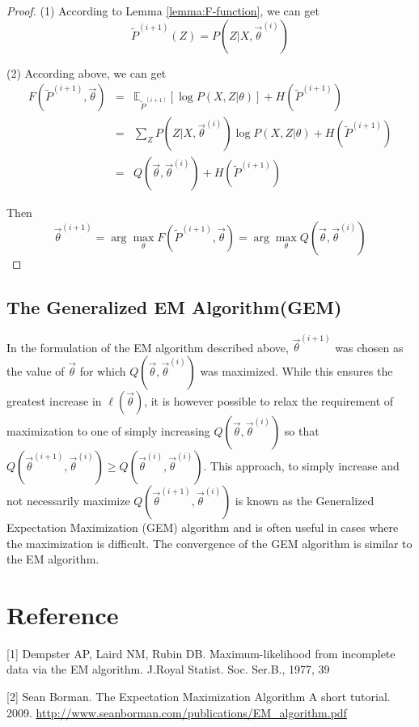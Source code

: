 \begin{proof}
(1) According to Lemma \ref{lemma:F-function}, we can get
\begin{equation}
\tilde{P}^{(i+1)}(Z)=P(Z|X, \vec{\theta}^{(i)}) \nonumber
\end{equation}

(2) According above, we can get
\begin{eqnarray}
F(\tilde{P}^{(i+1)},\vec{\theta}) &=& \mathbb{E}_{\tilde{P}^{(i+1)}}\left[\log{P(X,Z|\theta)}\right]+H(\tilde{P}^{(i+1)}) \nonumber \\
    &=& \sum\limits_Z{P(Z|X,\vec{\theta}^{(i)})\log{P(X,Z|\theta)}}+H(\tilde{P}^{(i+1)}) \nonumber \\
	&=& Q(\vec{\theta}, \vec{\theta}^{(i)})+H(\tilde{P}^{(i+1)})\nonumber
\end{eqnarray}

Then
\begin{equation}
\vec{\theta}^{(i+1)}=\arg\max\limits_{\theta}F(\tilde{P}^{(i+1)},\vec{\theta})=\arg\max\limits_{\theta}Q(\vec{\theta}, \vec{\theta}^{(i)}) \nonumber
\end{equation}
\end{proof}


\subsection{The Generalized EM Algorithm(GEM)}
In the formulation of the EM algorithm described above, $\vec{\theta}^{(i+1)}$ was chosen as the value of $\vec{\theta}$ for which $Q(\vec{\theta}, \vec{\theta}^{(i)})$ was maximized. While this ensures the greatest increase in $\ell(\vec{\theta})$, it is however possible to relax the requirement of maximization to one of simply increasing $Q(\vec{\theta}, \vec{\theta}^{(i)})$ so that $Q(\vec{\theta}^{(i+1)}, \vec{\theta}^{(i)}) \geq Q(\vec{\theta}^{(i)}, \vec{\theta}^{(i)})$. This approach, to simply increase and not necessarily maximize $Q(\vec{\theta}^{(i+1)}, \vec{\theta}^{(i)})$ is known as the Generalized Expectation Maximization (GEM) algorithm and is often useful in cases where the maximization is difficult. The convergence of the GEM algorithm is similar to the EM algorithm.


\section{Reference}
[1] Dempster AP, Laird NM, Rubin DB. Maximum-likelihood from incomplete data via the EM algorithm. J.Royal Statist. Soc. Ser.B., 1977, 39

[2] Sean Borman. The Expectation Maximization Algorithm A short tutorial. 2009. \url{http://www.seanborman.com/publications/EM_algorithm.pdf}